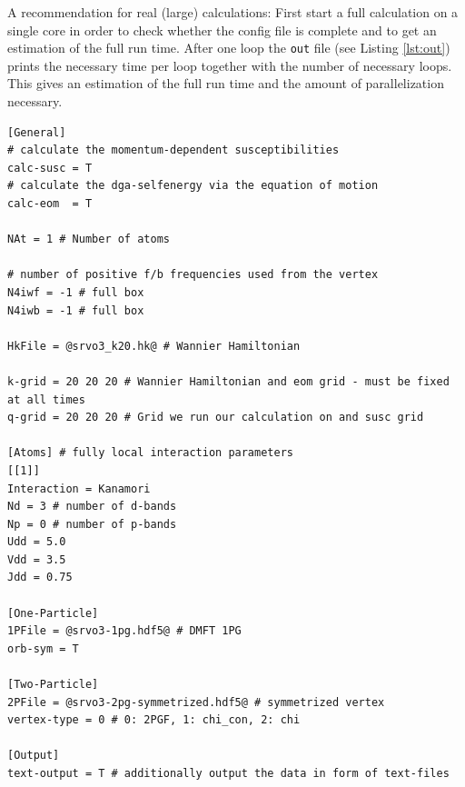 \documentclass[a4paper,11pt]{article}
\numberwithin{equation}{section} %
\begin{document}
A recommendation for real (large) calculations: First start a full calculation on a single core
in order to check whether the config file is complete and to get an estimation of the full run time.
After one loop the \verb+out+ file (see Listing \ref{lst:out}) prints the necessary time per loop together with the number of necessary loops. This gives an estimation of the full run time and the amount of parallelization necessary.

\newpage
\begin{lstlisting}[caption=config file for q-grid calculation, frame=single, basicstyle=\small, style=base2, label={lst:configqgrid}]
[General]
# calculate the momentum-dependent susceptibilities
calc-susc = T
# calculate the dga-selfenergy via the equation of motion
calc-eom  = T

NAt = 1 # Number of atoms

# number of positive f/b frequencies used from the vertex
N4iwf = -1 # full box
N4iwb = -1 # full box

HkFile = @srvo3_k20.hk@ # Wannier Hamiltonian

k-grid = 20 20 20 # Wannier Hamiltonian and eom grid - must be fixed at all times
q-grid = 20 20 20 # Grid we run our calculation on and susc grid

[Atoms] # fully local interaction parameters
[[1]]
Interaction = Kanamori
Nd = 3 # number of d-bands
Np = 0 # number of p-bands
Udd = 5.0
Vdd = 3.5
Jdd = 0.75

[One-Particle]
1PFile = @srvo3-1pg.hdf5@ # DMFT 1PG
orb-sym = T

[Two-Particle]
2PFile = @srvo3-2pg-symmetrized.hdf5@ # symmetrized vertex
vertex-type = 0 # 0: 2PGF, 1: chi_con, 2: chi

[Output]
text-output = T # additionally output the data in form of text-files
\end{lstlisting}
\end{document}
